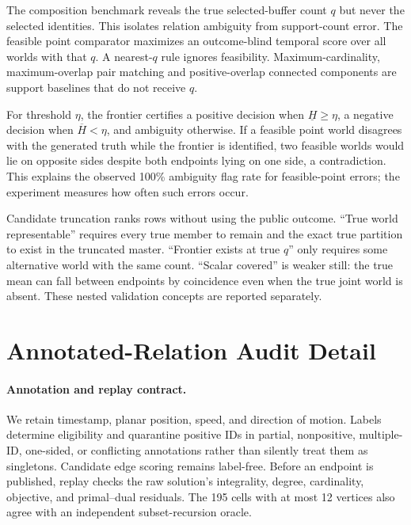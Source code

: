 The composition benchmark reveals the true selected-buffer count $q$ but never
the selected identities. This isolates relation ambiguity from support-count
error. The feasible point comparator maximizes an outcome-blind temporal score
over all worlds with that $q$. A nearest-$q$ rule ignores feasibility.
Maximum-cardinality, maximum-overlap pair matching and positive-overlap
connected components are support baselines that do not receive $q$.

For threshold $\eta$, the frontier certifies a positive decision when
$\underline H\ge\eta$, a negative decision when $\overline H<\eta$, and
ambiguity otherwise. If a feasible point world disagrees with the generated
truth while the frontier is identified, two feasible worlds would lie on
opposite sides despite both endpoints lying on one side, a contradiction.
This explains the observed 100\% ambiguity flag rate for feasible-point errors;
the experiment measures how often such errors occur.

Candidate truncation ranks rows without using the public outcome. ``True world
representable'' requires every true member to remain and the exact true
partition to exist in the truncated master. ``Frontier exists at true $q$''
only requires some alternative world with the same count. ``Scalar covered''
is weaker still: the true mean can fall between endpoints by coincidence even
when the true joint world is absent. These nested validation concepts are
reported separately.

\section{Annotated-Relation Audit Detail}

\paragraph{Annotation and replay contract.}
We retain timestamp, planar position, speed, and direction of motion. Labels
determine eligibility and quarantine positive IDs in partial, nonpositive,
multiple-ID, one-sided, or conflicting annotations rather than silently treat
them as singletons. Candidate edge scoring remains label-free. Before an
endpoint is published, replay checks the raw solution's integrality, degree,
cardinality, objective, and primal--dual residuals. The 195 cells with at most
12 vertices also agree with an independent subset-recursion oracle.

